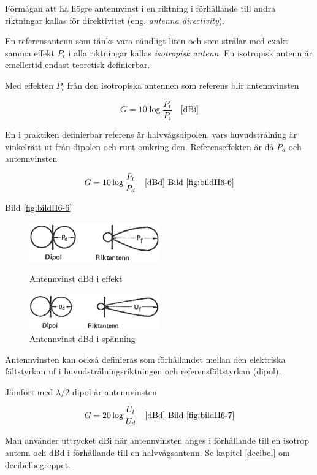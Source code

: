 Förmågan att ha högre antennvinst i en riktning i förhållande till andra
riktningar kallas för direktivitet (eng. \emph{antenna directivity}).

En referensantenn som tänks vara oändligt liten och som strålar med exakt
samma effekt \(P_t\) i alla riktningar kallas \emph{isotropisk antenn}.
En isotropisk antenn är emellertid endast teoretisk definierbar.

Med effekten \(P_i\) från den isotropiska antennen som referens blir
antennvinsten

\[G = 10 \log\frac{P_t}{P_i} \quad \text{[dBi]}\]

En i praktiken definierbar referens är halvvågsdipolen, vars
huvudstrålning är vinkelrätt ut från dipolen och runt omkring den.
Referenseffekten är då \(P_d\) och antennvinsten

\[G = 10 \log\frac{P_t}{P_d} \quad \text{[dBd] Bild \ref{fig:bildII6-6}}\]

Bild \ref{fig:bildII6-6}

\begin{figure}
  \includegraphics[width=0.5\textwidth]{images/cropped_pdfs/bild_2_6-06.pdf}
  \caption{Antennvinst dBd i effekt}
  \label{fig:bildII6-6}

  \includegraphics[width=0.5\textwidth]{images/cropped_pdfs/bild_2_6-07.pdf}
  \caption{Antennvinst dBd i spänning}
  \label{fig:bildII6-7}
\end{figure}

Antennvinsten kan också definieras som förhållandet mellan den
elektriska fältstyrkan uf i huvudstrålningsriktningen och
referensfältstyrkan (dipol).

Jämfört med \(\lambda/2\)-dipol är antennvinsten

\[G = 20 \log\frac{U_t}{U_d} \quad \text{[dBd] Bild \ref{fig:bildII6-7}}\]

Man använder uttrycket dBi när antennvinsten anges i förhållande till
en isotrop antenn och dBd i förhållande till en halvvågsantenn.
Se kapitel \ref{decibel} om decibelbegreppet.

